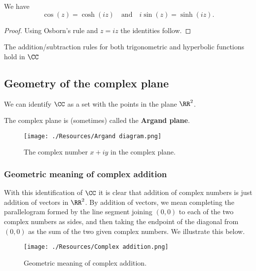 \documentclass[12pt, a4paper]{article}
\begin{document}
\begin{corollary}
    We have 
    \[\cos(z)=\cosh(iz) \quad \text{and} \quad i\sin(z)=\sinh(iz).\]
\end{corollary}

\begin{proof}
    Using Osborn's rule and \(z=iz\) the identities follow.
\end{proof}

\begin{theorem}
    The addition/subtraction rules for both trigonometric and hyperbolic functions hold in \(\CC\)
\end{theorem}

\subsection{Geometry of the complex plane}

We can identify \(\CC\) as a set with the points in the plane \(\RR^2\).

\begin{definition}
    The complex plane is (sometimes) called the \textbf{Argand plane}.
\end{definition}

\begin{figure}[H]
     \begin{center}
         \texttt{[image: ./Resources/Argand diagram.png]}
     \end{center}
    \caption{The complex number \(x+iy\) in the complex plane.}
\end{figure}

\subsubsection*{Geometric meaning of complex addition}

With this identification of \(\CC\) it is clear that addition of complex numbers is just addition of vectors in \(\RR^2\). By addition of vectors, we mean completing the parallelogram formed by the line segment joining \((0,0)\) to each of the two complex numbers as sides, and then taking the endpoint of the diagonal from \((0,0)\) as the sum of the two given complex numbers. We illustrate this below.

\begin{figure}[H]
     \begin{center}
         \texttt{[image: ./Resources/Complex addition.png]}
     \end{center}
     \caption{Geometric meaning of complex addition.}
\end{figure}
\end{document}
